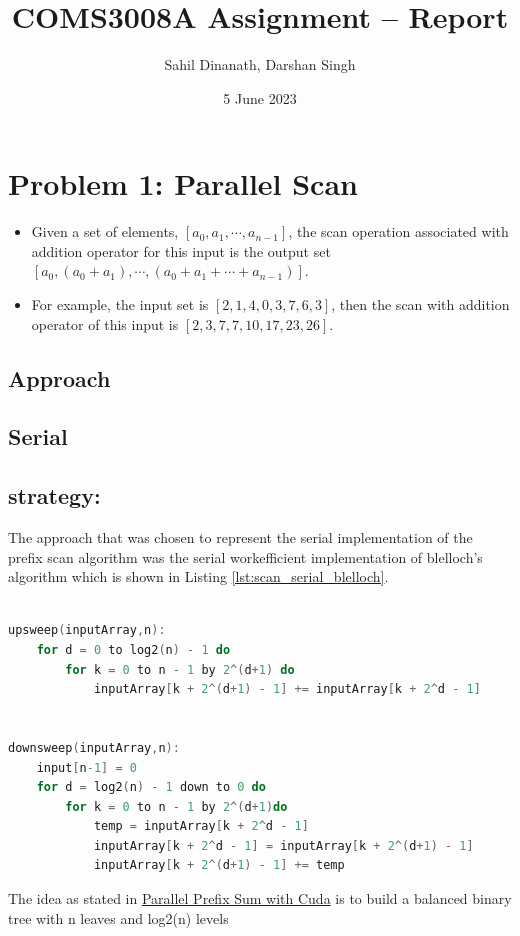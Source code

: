 
\title{COMS3008A Assignment -- Report}
\author{Sahil Dinanath, Darshan Singh}
\date{5 June 2023} 
\maketitle 
\pagestyle{fancy}
\fancyhf{}
\fancyhead[R]{\thepage}
{} 
\section{Problem 1: Parallel Scan}
\begin{itemize}
	\item  Given a set of elements, $[a_0,a_1,\dotsm,a_{n-1}]$, the scan operation associated with addition operator for this input is the output set $[a_0,(a_0+a_1),\dotsm,(a_0+a_1+\dotsm+a_{n-1})]$. 
	\item For example, the input set is $[2,1,4,0,3,7,6,3]$, then the scan with addition operator of this input is $[2,3,7,7,10,17,23,26]$. 
\end{itemize}
\subsection*{Approach}
\subsection{Serial} 
\subsection*{strategy:}
The approach that was chosen to represent the serial implementation of the prefix scan algorithm was the serial workefficient implementation of blelloch's algorithm which is shown in Listing \ref{lst:scan_serial_blelloch}. 
\begin{lstlisting}[language=C, caption={upsweep and downsweep pseudocode}, label={lst:scan_serial_blelloch}]

upsweep(inputArray,n):
	for d = 0 to log2(n) - 1 do
    	for k = 0 to n - 1 by 2^(d+1) do
        	inputArray[k + 2^(d+1) - 1] += inputArray[k + 2^d - 1]


downsweep(inputArray,n):
	input[n-1] = 0
	for d = log2(n) - 1 down to 0 do 
		for k = 0 to n - 1 by 2^(d+1)do 
			temp = inputArray[k + 2^d - 1] 
			inputArray[k + 2^d - 1] = inputArray[k + 2^(d+1) - 1]
			inputArray[k + 2^(d+1) - 1] += temp

\end{lstlisting}
The idea as stated in \href{https://developer.nvidia.com/gpugems/gpugems3/part-vi-gpu-computing/chapter-39-parallel-prefix-sum-scan-cuda}{Parallel Prefix Sum with Cuda} is to build a balanced binary tree with n leaves and log2(n) levels

